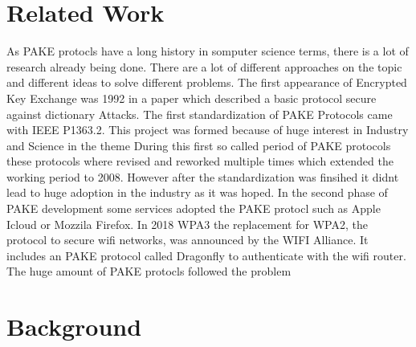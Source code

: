 \documentclass[journal]{IEEEtran}
\begin{document}
\section{Related Work}
As PAKE protocls have a long history in somputer science terms, there is a lot of research already being done.
There are a lot of different approaches on the topic and different ideas to solve different problems.
The first appearance of Encrypted Key Exchange was 1992 in a paper which described a basic protocol secure against dictionary Attacks.
The first standardization of PAKE Protocols came with IEEE P1363.2. This project was formed because of huge interest in Industry and Science in the theme
During this first so called period of PAKE protocols these protocols where revised and reworked multiple times which extended the working period to 2008.
However after the standardization was finsihed it didnt lead to huge adoption in the industry as it was hoped.
In the second phase of PAKE development some services adopted the PAKE protocl such as Apple Icloud or Mozzila Firefox.
In 2018 WPA3 the replacement for WPA2, the protocol to secure wifi networks, was announced by the WIFI Alliance.
It includes an PAKE protocol called Dragonfly to authenticate with the wifi router. 
The huge amount of PAKE protocls followed the problem
\section{Background}
\end{document}
